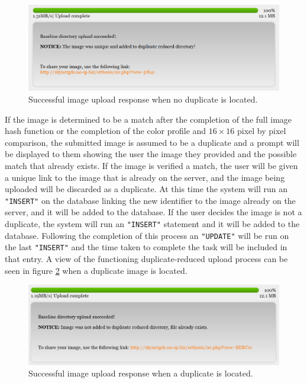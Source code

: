 \begin{figure}[htbp]
\centering
\includegraphics[width=5.5in]{success_nodupfound}
\caption{Successful image upload response when no duplicate is located.}
\label{success_nodupfound}
\end{figure}

If the image is determined to be a match after the completion of the full image hash function or the completion of the color profile and $16\times16$ pixel by pixel comparison, the submitted image is assumed to be a duplicate and a prompt will be displayed to them showing the user the image they provided and the possible match that already exists. If the image is verified a match, the user will be given a unique link to the image that is already on the server, and the image being uploaded will be discarded as a duplicate. At this time the system will run an {\tt "INSERT"} on the database linking the new identifier to the image already on the server, and it will be added to the database. If the user decides the image is not a duplicate, the system will run an {\tt "INSERT"} statement and it will be added to the database. Following the completion of this process an {\tt "UPDATE"} will be run on the last {\tt "INSERT"} and the time taken to complete the task will be included in that entry. A view of the functioning duplicate-reduced upload process can be seen in figure \ref{success_dupfound} when a duplicate image is located.

\begin{figure}[htbp]
\centering
\includegraphics[width=5.5in]{success_dupfound}
\caption{Successful image upload response when a duplicate is located.}
\label{success_dupfound}
\end{figure}

